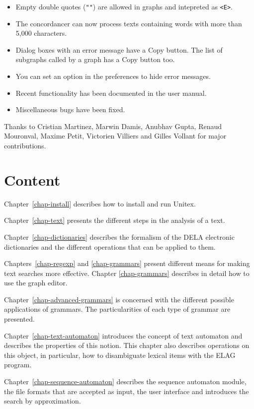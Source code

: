 \begin{itemize}
  \item Empty double quotes (\verb$""$) are allowed in graphs and intepreted
  as \verb$<E>$.
  \item The concordancer can now process texts containing words with more than
   5,000  characters.
  \item Dialog boxes with an error message have a Copy button. The list of
  subgraphs called by a graph has a Copy button too.
  \item You can set an option in the preferences to hide error messages.
  \item Recent functionality has been documented in the user manual.
  \item Miscellaneous bugs have been fixed.
\end{itemize}

\noindent Thanks to Cristian Martinez, Marwin Damis, Anubhav Gupta, Renaud Mouronval,
Maxime Petit, Victorien Villiers and Gilles Vollant for major contributions.

\section*{Content}
\noindent Chapter~\ref{chap-install} describes how to install and run
Unitex.

\bigskip \noindent Chapter~\ref{chap-text} presents the different steps in the
analysis of  a text.

\bigskip \noindent Chapter~\ref{chap-dictionaries} describes the formalism of
the DELA electronic dictionaries and the different operations that can be applied to them.

\bigskip \noindent Chapters~\ref{chap-regexp} and \ref{chap-grammars}
present different means for making text searches more effective. 
Chapter \ref{chap-grammars} describes in detail how to use the graph
editor.

\bigskip \noindent Chapter~\ref{chap-advanced-grammars} is concerned
with the different possible applications of grammars. The particularities of each type of grammar are
presented.

\bigskip \noindent Chapter~\ref{chap-text-automaton} introduces the 
concept of text automaton and describes the properties of this notion. This chapter also describes 
operations on this object, in particular, how to disambiguate lexical items with
the ELAG program.

\bigskip \noindent Chapter~\ref{chap-sequence-automaton} describes the sequence automaton module, the file formats that are accepted as input, the user interface and introduces the search by approximation.

